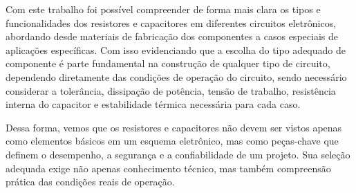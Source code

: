 \documentclass[12pt]{article}
\begin{document}
    Com este trabalho foi possível compreender de forma mais clara os tipos e funcionalidades dos resistores e capacitores em diferentes circuitos eletrônicos, abordando desde materiais de fabricação dos componentes a casos especiais de aplicações específicas. Com isso evidenciando que a escolha do tipo adequado de componente é parte fundamental na construção de qualquer tipo de circuito, dependendo diretamente das condições de operação do circuito, sendo necessário considerar a tolerância, dissipação de potência, tensão de trabalho, resistência interna do capacitor e estabilidade térmica necessária para cada caso.

    Dessa forma, vemos que os resistores e capacitores não devem ser vistos apenas como elementos básicos em um esquema eletrônico, mas como peças-chave que definem o desempenho, a segurança e a confiabilidade de um projeto. Sua seleção adequada exige não apenas conhecimento técnico, mas também compreensão prática das condições reais de operação.

\newpage


\end{document}
